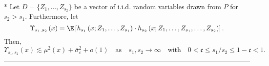 \newpage
\begin{lem}\label{lem:upsilon_s}\mbox{}\\*
	Let $D = \{Z_1, \dotsc, Z_{s_2}\}$ be a vector of i.i.d. random variables drawn from $P$ for $s_2 > s_1$.
	Furthermore, let
	\begin{equation}
		\Upsilon_{s_1, s_2}\left(x\right)
		= \E\left[h_{s_1}\left(x; Z_1, \ldots,  Z_{s_1}\right) \cdot
			h_{s_2}\left(x; Z_1, \ldots,Z_{s_1}, \ldots, Z_{s_2}\right)\right].
	\end{equation}
	Then,
	\begin{equation}
		\Upsilon_{s_1, s_2}\left(x\right)
		\lesssim \mu^{2}\left(x\right) + \overline{\sigma}^2_{\varepsilon} + o(1)
		\quad \text{as} \quad s_1, s_2 \rightarrow \infty
		\quad \text{with} \quad
		0 < \mathfrak{c} \leq s_1 / s_2 \leq 1 - \mathfrak{c} < 1.
	\end{equation}
\end{lem}
\hrule

